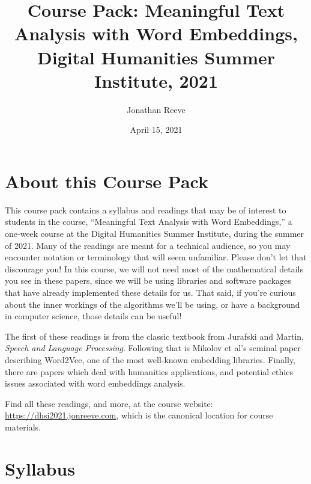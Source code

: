 \documentclass[a4paper]{report}
\title{Course Pack: Meaningful Text Analysis with Word Embeddings, Digital Humanities Summer Institute, 2021}
\author{Jonathan Reeve}
\date{April 15, 2021}
\begin{document}
\maketitle

\tableofcontents

\chapter{About this Course Pack}

This course pack contains a syllabus and readings that may be of interest to students in the course, ``Meaningful Text Analysis with Word Embeddings,'' a one-week course at the Digital Humanities Summer Institute, during the summer of 2021. Many of the readings are meant for a technical audience, so you may encounter notation or terminology that will seem unfamiliar. Please don't let that discourage you! In this course, we will not need most of the mathematical details you see in these papers, since we will be using libraries and software packages that have already implemented these details for us. That said, if you're curious about the inner workings of the algorithms we'll be using, or have a background in computer science, those details can be useful!

The first of these readings is from the classic textbook from Jurafski and Martin, \emph{Speech and Language Processing}. Following that is Mikolov et al's seminal paper describing Word2Vec, one of the most well-known embedding libraries. Finally, there are papers which deal with humanities applications, and potential ethics issues associated with word embeddings analysis.

Find all these readings, and more, at the course website: \url{https://dhsi2021.jonreeve.com}, which is the canonical location for course materials.




\chapter{Syllabus}
\end{document}
